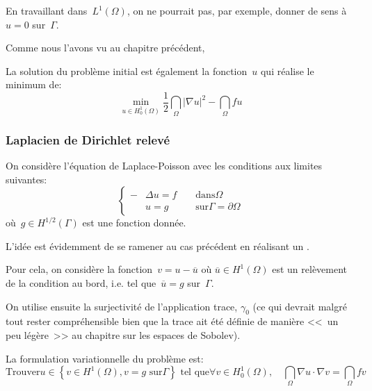 En travaillant dans~$L^1(\Omega)$, on ne pourrait pas, par exemple, donner de sens
à~$u = 0$ sur~$\Gamma$.

\medskip
Comme nous l'avons vu au chapitre précédent, 

La solution du problème initial est également la fonction~$u$ qui réalise
le minimum de:
\begin{equation}
\min_{u\in H^1_0(\Omega)} \dfrac12\dint_\Omega |\nabla u|^2-\dint_\Omega fu
\end{equation}

\medskip
\subsubsection{Laplacien de Dirichlet relevé}
On considère l'équation de Laplace-Poisson avec les conditions aux limites suivantes:
\begin{equation}\left\{\begin{aligned}
-&\Delta u=f &&\text{ dans} \Omega\\
&u=g &&\text{ sur} \Gamma=\partial\Omega
\end{aligned}
\right.
\end{equation}
où~$g\in H^{1/2}(\Gamma)$ est une fonction donnée.

\medskip
L'idée est évidemment de se ramener au cas précédent en réalisant un
.

Pour cela, on considère la fonction~$v = u - \overline{u}$ où
$\overline{u}\in H^1(\Omega)$ est un relèvement de la condition
au bord, i.e. tel que~$\overline{u}=g$ sur~$\Gamma$.

On utilise ensuite la surjectivité de l'application trace, $\gamma_0$ (ce qui
devrait malgré tout rester compréhensible bien que la trace ait été définie
de manière <<~un peu légère~>> au chapitre sur les espaces de
Sobolev).

\medskip
La formulation variationnelle du problème est:
\begin{equation}
\text{Trouver}u\in \left\{ v\in H^1(\Omega), v=g \text{ sur} \Gamma\right\}
 \text{ tel que}
\forall v\in H^1_0(\Omega),
\quad\dint_\Omega \nabla u\cdot\nabla v = \dint_\Omega fv
\end{equation}

